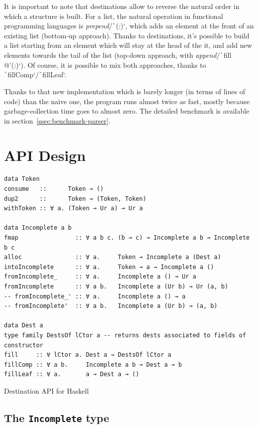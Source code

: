 \documentclass[english]{jflart}
\begin{document}
It is important to note that destinations allow to reverse the natural order in which a structure is built. For a list, the natural operation in functional programming languages is \emph{prepend}/\texttt`(:)`, which adds an element at the front of an existing list (bottom-up approach). Thanks to destinations, it's possible to build a list starting from an element which will stay at the head of the it, and add new elements towards the tail of the list (top-down approach, with \emph{append}/\texttt`fill @'(:)`). Of course, it is possible to mix both approaches, thanks to \texttt`fillComp`/\texttt`fillLeaf`.

Thanks to that new implementation which is barely longer (in terms of lines of code) than the naive one, the program runs almost twice as fast, mostly because garbage-collection time goes to almost zero. The detailed benchmark is available in section~\ref{ssec:benchmark-parser}.

\section{API Design}\label{sec:api}

\begin{table}[t]
\small
\begin{verbatim}
data Token
consume   ::      Token ⊸ ()
dup2      ::      Token ⊸ (Token, Token)
withToken :: ∀ a. (Token ⊸ Ur a) ⊸ Ur a

data Incomplete a b
fmap                :: ∀ a b c. (b ⊸ c) ⊸ Incomplete a b ⊸ Incomplete b c
alloc               :: ∀ a.     Token ⊸ Incomplete a (Dest a)
intoIncomplete      :: ∀ a.     Token ⊸ a → Incomplete a ()
fromIncomplete_     :: ∀ a.     Incomplete a () ⊸ Ur a
fromIncomplete      :: ∀ a b.   Incomplete a (Ur b) ⊸ Ur (a, b)
-- fromIncomplete_' :: ∀ a.     Incomplete a () ⊸ a
-- fromIncomplete'  :: ∀ a b.   Incomplete a (Ur b) ⊸ (a, b)

data Dest a
type family DestsOf lCtor a -- returns dests associated to fields of constructor
fill     :: ∀ lCtor a. Dest a → DestsOf lCtor a
fillComp :: ∀ a b.     Incomplete a b ⊸ Dest a ⊸ b
fillLeaf :: ∀ a.       a → Dest a ⊸ ()
\end{verbatim}
\caption{Destination API for Haskell}
\label{table:destination-api}
\end{table}

\subsection{The \texttt{Incomplete} type}
\end{document}
